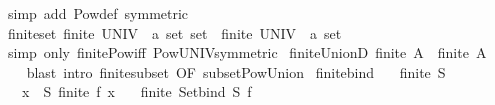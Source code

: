 \begin{isabellebody}
\ {\isacharparenleft}{\kern0pt}simp\ add{\isacharcolon}{\kern0pt}\ Pow{\isacharunderscore}{\kern0pt}def\ {\isacharbrackleft}{\kern0pt}symmetric{\isacharbrackright}{\kern0pt}{\isacharparenright}{\kern0pt}%
\endisatagproof
{\isafoldproof}%
%
\isadelimproof
\isanewline
%
\endisadelimproof
\isanewline
{}\isamarkupfalse%
\ finite{\isacharunderscore}{\kern0pt}set{\isacharcolon}{\kern0pt}\ {\isachardoublequoteopen}finite\ {\isacharparenleft}{\kern0pt}UNIV\ {\isacharcolon}{\kern0pt}{\isacharcolon}{\kern0pt}\ {\isacharprime}{\kern0pt}a\ set\ set{\isacharparenright}{\kern0pt}\ {\isasymlongleftrightarrow}\ finite\ {\isacharparenleft}{\kern0pt}UNIV\ {\isacharcolon}{\kern0pt}{\isacharcolon}{\kern0pt}\ {\isacharprime}{\kern0pt}a\ set{\isacharparenright}{\kern0pt}{\isachardoublequoteclose}\isanewline
%
\isadelimproof
\ \ %
\endisadelimproof
%
\isatagproof
{}\isamarkupfalse%
\ {\isacharparenleft}{\kern0pt}simp\ only{\isacharcolon}{\kern0pt}\ finite{\isacharunderscore}{\kern0pt}Pow{\isacharunderscore}{\kern0pt}iff\ Pow{\isacharunderscore}{\kern0pt}UNIV{\isacharbrackleft}{\kern0pt}symmetric{\isacharbrackright}{\kern0pt}{\isacharparenright}{\kern0pt}%
\endisatagproof
{\isafoldproof}%
%
\isadelimproof
\isanewline
%
\endisadelimproof
\isanewline
{}\isamarkupfalse%
\ finite{\isacharunderscore}{\kern0pt}UnionD{\isacharcolon}{\kern0pt}\ {\isachardoublequoteopen}finite\ {\isacharparenleft}{\kern0pt}{\isasymUnion}A{\isacharparenright}{\kern0pt}\ {\isasymLongrightarrow}\ finite\ A{\isachardoublequoteclose}\isanewline
%
\isadelimproof
\ \ %
\endisadelimproof
%
\isatagproof
{}\isamarkupfalse%
\ {\isacharparenleft}{\kern0pt}blast\ intro{\isacharcolon}{\kern0pt}\ finite{\isacharunderscore}{\kern0pt}subset\ {\isacharbrackleft}{\kern0pt}OF\ subset{\isacharunderscore}{\kern0pt}Pow{\isacharunderscore}{\kern0pt}Union{\isacharbrackright}{\kern0pt}{\isacharparenright}{\kern0pt}%
\endisatagproof
{\isafoldproof}%
%
\isadelimproof
\isanewline
%
\endisadelimproof
\isanewline
{}\isamarkupfalse%
\ finite{\isacharunderscore}{\kern0pt}bind{\isacharcolon}{\kern0pt}\isanewline
\ \ \ {\isachardoublequoteopen}finite\ S{\isachardoublequoteclose}\isanewline
\ \ \ {\isachardoublequoteopen}{\isasymforall}x\ {\isasymin}\ S{\isachardot}{\kern0pt}\ finite\ {\isacharparenleft}{\kern0pt}f\ x{\isacharparenright}{\kern0pt}{\isachardoublequoteclose}\isanewline
\ \ \ {\isachardoublequoteopen}finite\ {\isacharparenleft}{\kern0pt}Set{\isachardot}{\kern0pt}bind\ S\ f{\isacharparenright}{\kern0pt}{\isachardoublequoteclose}\isanewline

\end{isabellebody}
